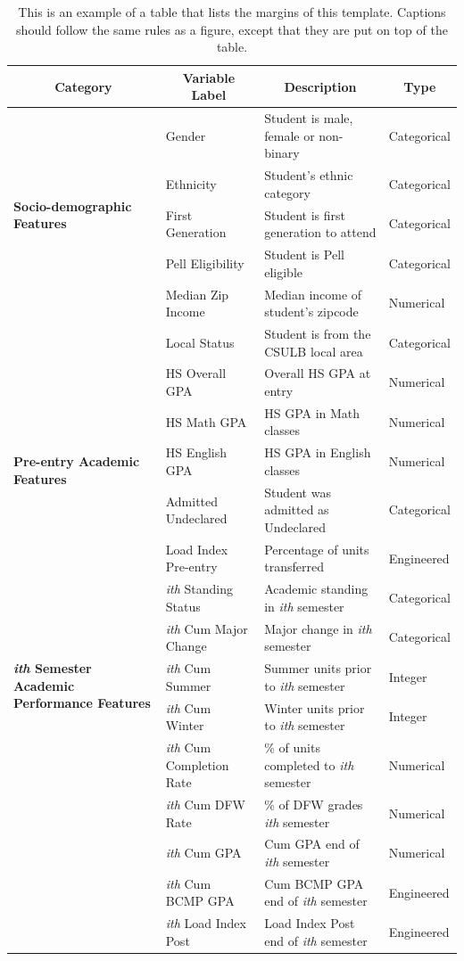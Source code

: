 \documentclass[notitlepage,12pt]{jedm}
\begin{document}
\begin{table}[h!]
  \caption{This is an example of a table that lists the margins of this template.  Captions should follow the same rules as a figure, except that they are put on top of the table.}\vspace*{1ex}
  \label{tab:1}
  \centering
  \begin{tabular}{| l | l | l | l |}
    \hline
    \multicolumn{1}{|c|}{\textbf{Category}} 
    & \multicolumn{1}{c|}{\textbf{Variable Label}} 
    &  \multicolumn{1}{c|}{\textbf{Description}} 
    &  \multicolumn{1}{c|}{\textbf{Type}} \\
    \hline
    \multirow{5}{6em}{\textbf{Socio-demographic Features}} 
    & Gender & Student is male, female or non-binary & Categorical\\
    & Ethnicity & Student's ethnic category & Categorical \\
    & First Generation & Student is first generation to attend  & Categorical \\
    & Pell Eligibility & Student is Pell eligible & Categorical \\
    & Median Zip Income & Median income of student's zipcode & Numerical \\
    & Local Status & Student is from the CSULB local area & Categorical \\
    \hline
    \multirow{5}{5em}{\textbf{Pre-entry Academic Features}} 
    & HS Overall GPA & Overall HS GPA at entry & Numerical\\
    & HS Math GPA & HS GPA in Math classes & Numerical \\
    & HS English GPA & HS GPA in English classes & Numerical \\
    & Admitted Undeclared & Student was admitted as Undeclared & Categorical \\
    & Load Index Pre-entry & Percentage of units transferred & Engineered \\
    \hline
    \multirow{5}{5em}{\textbf{\emph{ith} Semester Academic Performance Features}} 
    & \emph{ith} Standing Status & Academic standing in \emph{ith} semester & Categorical\\
    & \emph{ith} Cum Major Change  & Major change in \emph{ith} semester & Categorical\\
    & \emph{ith} Cum Summer & Summer units prior to \emph{ith} semester & Integer\\
    & \emph{ith} Cum Winter & Winter units prior to \emph{ith} semester & Integer\\
    & \emph{ith} Cum Completion Rate & \% of units completed to \emph{ith} semester & Numerical\\
    & \emph{ith} Cum DFW Rate & \% of DFW grades \emph{ith} semester & Numerical\\
    & \emph{ith} Cum GPA & Cum GPA end of \emph{ith} semester & Numerical\\
    & \emph{ith} Cum BCMP GPA & Cum BCMP GPA end of \emph{ith} semester & Engineered\\
    & \emph{ith} Load Index Post & Load Index Post end of \emph{ith} semester & Engineered\\
    

\end{tabular}
\end{table}
\end{document}
